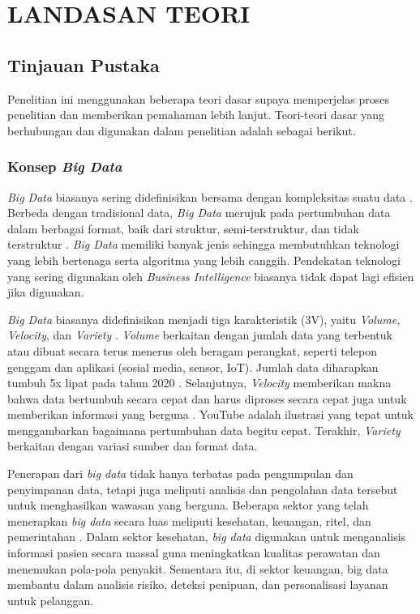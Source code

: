 \chapter{LANDASAN TEORI}

\section{Tinjauan Pustaka}
Penelitian ini menggunakan beberapa teori dasar supaya memperjelas proses penelitian dan memberikan pemahaman lebih lanjut. Teori-teori dasar yang berhubungan dan digunakan dalam penelitian adalah sebagai berikut.

\subsection{Konsep \textit{Big Data}}
\textit{Big Data} biasanya sering didefinisikan bersama dengan kompleksitas suatu data \cite{barosenAnalysisComparisonInterfacing2018}. Berbeda dengan tradisional data, \textit{Big Data} merujuk pada pertumbuhan data dalam berbagai format, baik dari struktur, semi-terstruktur, dan tidak terstruktur \cite{oussousBigDataTechnologies2018}. \textit{Big Data} memiliki banyak jenis sehingga membutuhkan teknologi yang lebih bertenaga serta algoritma yang lebih canggih. Pendekatan teknologi yang sering digunakan oleh \textit{Business Intelligence} biasanya tidak dapat lagi efisien jika digunakan.

\textit{Big Data} biasanya didefinisikan menjadi tiga karakteristik (3V), yaitu \textit{Volume, Velocity}, dan \textit{Variety} \cite{furhtIntroductionBigData2016}. \textit{Volume} berkaitan dengan jumlah data yang terbentuk atau dibuat secara terus menerus oleh beragam  perangkat, seperti telepon genggam dan aplikasi (sosial media, sensor, IoT). Jumlah data diharapkan tumbuh 5x lipat pada tahun 2020 \cite{furhtIntroductionBigData2016}. Selanjutnya, \textit{Velocity} memberikan makna bahwa data bertumbuh secara cepat dan harus diproses secara cepat juga untuk memberikan informasi yang berguna \cite{sandhuBigDataCloud2022}. YouTube adalah ilustrasi yang tepat untuk menggambarkan bagaimana pertumbuhan data begitu cepat. Terakhir, \textit{Variety} berkaitan dengan variasi sumber dan format data. 

Penerapan dari \textit{big data} tidak hanya terbatas pada pengumpulan dan penyimpanan data, tetapi juga meliputi analisis dan pengolahan data tersebut untuk menghasilkan wawasan yang berguna. Beberapa sektor yang telah menerapkan \textit{big data} secara luas meliputi kesehatan, keuangan, ritel, dan pemerintahan \cite{oussousBigDataTechnologies2018}. Dalam sektor kesehatan, \textit{big data} digunakan untuk menganalisis informasi pasien secara massal guna meningkatkan kualitas perawatan dan menemukan pola-pola penyakit. Sementara itu, di sektor keuangan, big data membantu dalam analisis risiko, deteksi penipuan, dan personalisasi layanan untuk pelanggan.

